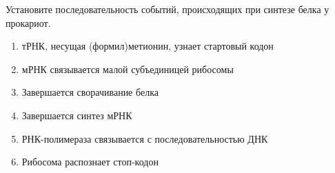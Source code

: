 
Установите последовательность событий, происходящих при синтезе белка у прокариот.

\begin{enumerate}
    \item тРНК, несущая (формил)метионин, узнает стартовый кодон
    \item мРНК связывается малой субъединицей рибосомы
    \item Завершается сворачивание белка
    \item Завершается синтез мРНК
    \item РНК-полимераза связывается с последовательностью ДНК
    \item Рибосома распознает стоп-кодон
\end{enumerate}

